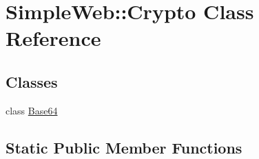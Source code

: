 \hypertarget{class_simple_web_1_1_crypto}{}\section{Simple\+Web\+:\+:Crypto Class Reference}
\label{class_simple_web_1_1_crypto}
\subsection*{Classes}
\begin{DoxyCompactItemize}
\item 
class \hyperlink{class_simple_web_1_1_crypto_1_1_base64}{Base64}
\end{DoxyCompactItemize}
\subsection*{Static Public Member Functions}
